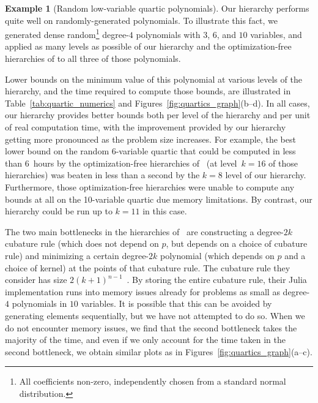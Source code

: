 \documentclass[11pt]{article}
\numberwithin{theorem}{section}
\theoremstyle{definition}
\newtheorem{example}[theorem]{Example}
\begin{document}
\begin{example}[Random low-variable quartic polynomials]\label{exam:random_poly}
    Our hierarchy performs quite well on randomly-generated polynomials. To illustrate this fact, we generated dense random\footnote{All coefficients non-zero, independently chosen from a standard normal distribution.} degree-$4$ polynomials with $3$, $6$, and $10$ variables, and applied as many levels as possible of our hierarchy and the optimization-free hierarchies of \cite{cristancho2024harmonic} to all three of those polynomials.

Lower bounds on the minimum value of this polynomial at various levels of the hierarchy, and the time required to compute those bounds, are illustrated in Table~\ref{tab:quartic_numerics} and Figures~\ref{fig:quartics_graph}(b--d). In all cases, our hierarchy provides better bounds both per level of the hierarchy and per unit of real computation time, with the improvement provided by our hierarchy getting more pronounced as the problem size increases. For example, the best lower bound on the random 6-variable quartic that could be computed in less than 6~hours by the optimization-free hierarchies of~\cite{cristancho2024harmonic} (at level~$k = 16$ of those hierarchies) was beaten in less than a second by the $k = 8$ level of our hierarchy. Furthermore, those optimization-free hierarchies were unable to compute any bounds at all on the 10-variable quartic due memory limitations. %
     By contrast, our hierarchy could be run up to $k=11$ in this case.
     
The two main bottlenecks in the hierarchies of~\cite{cristancho2024harmonic} are constructing a degree-$2k$ cubature rule (which does not depend on $p$, but depends on a choice of cubature rule) and minimizing a certain degree-$2k$ polynomial (which depends on $p$ and a choice of kernel) at the points of that cubature rule. The cubature rule they consider has size $2(k+1)^{n-1}$~\cite[Corollary 2.3]{cristancho2024harmonic}. By storing the entire cubature rule, their Julia implementation runs into memory issues already for problems as small as degree-$4$ polynomials in $10$ variables. It is possible that this can be avoided by generating elements sequentially, but we have not attempted to do so. When we do not encounter memory issues, we find that the second bottleneck takes the majority of the time, and even if we only account for the time taken in the second bottleneck, we obtain similar plots as in Figures~\ref{fig:quartics_graph}(a--c).


\end{example}
\end{document}
